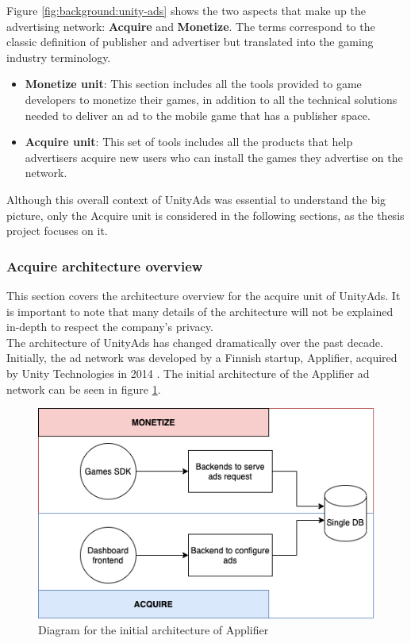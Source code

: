 \documentclass[english, 12pt, a4paper, sci, utf8, a-1b, online]{aaltothesis}
\begin{document}
Figure \ref{fig:background:unity-ads} shows the two aspects that make up the advertising network: \textbf{Acquire} and \textbf{Monetize}. The terms correspond to the classic definition of publisher and advertiser but translated into the gaming industry terminology.

\begin{itemize}
    \item \textbf{Monetize unit}: This section includes all the tools provided to game developers to monetize their games, in addition to all the technical solutions needed to deliver an ad to the mobile game that has a publisher space.
    \item \textbf{Acquire unit}: This set of tools includes all the products that help advertisers acquire new users who can install the games they advertise on the network.
\end{itemize}

Although this overall context of UnityAds was essential to understand the big picture, only the Acquire unit is considered in the following sections, as the thesis project focuses on it.

\subsubsection{Acquire architecture overview}
\label{sec:acquire-architecture}

This section covers the architecture overview for the acquire unit of UnityAds. It is important to note that many details of the architecture will not be explained in-depth to respect the company's privacy.\\

The architecture of UnityAds has changed dramatically over the past decade. Initially, the ad network was developed by a Finnish startup, Applifier, acquired by Unity Technologies in 2014 \cite{UnityBuyApplifier}. The initial architecture of the Applifier ad network can be seen in figure \ref{fig:background:applifier-architecture}.

\begin{figure}[h]
    \centering
    \includegraphics[scale=0.4]{src/thesis/img/background/applifier-unityads-architecture.png}
    \caption{Diagram for the initial architecture of Applifier}
    \label{fig:background:applifier-architecture}
\end{figure}
\end{document}

